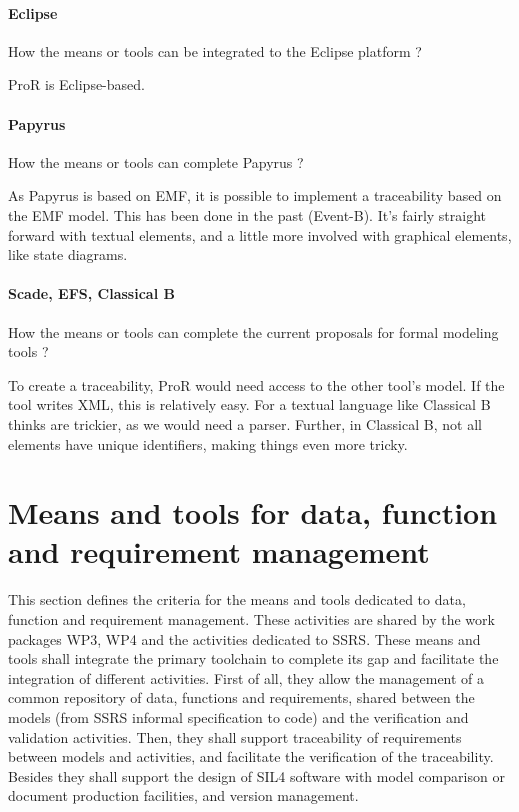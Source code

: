 \paragraph{Eclipse}
How the means or tools can be integrated to the Eclipse platform ?

\begin{author_comment}
ProR is Eclipse-based.
\end{author_comment}

\paragraph{Papyrus}
How the means or tools can complete  Papyrus ?

\begin{author_comment}
As Papyrus is based on EMF, it is possible to implement a traceability based on the EMF model.  This has been done in the past (Event-B).  It's fairly straight forward with textual elements, and a little more involved with graphical elements, like state diagrams.

\end{author_comment}

\paragraph{Scade, EFS, Classical B}
How the means or tools can complete the current proposals for formal modeling tools ?

\begin{author_comment}
To create a traceability, ProR would need access to the other tool's model.  If the tool writes XML, this is relatively easy.  For a textual language like Classical B thinks are trickier, as we would need a parser.  Further, in Classical B, not all elements have unique identifiers, making things even more tricky.
\end{author_comment}


\section{Means and tools for data, function and requirement management}
\label{sec:management}


This section defines the criteria for the means and tools dedicated to data, function and requirement management. These activities are shared by the work packages WP3, WP4 and the activities dedicated to  SSRS.
These means and tools shall integrate the primary toolchain to  complete its gap and facilitate the integration of different activities. First of all, they  allow the management of a common repository of data, functions and requirements, shared between the models (from SSRS informal specification to code) and the verification and validation activities.  
Then, they shall support traceability of requirements between models and activities, and facilitate the verification of the traceability.
Besides they shall support the design of SIL4 software with model comparison or document production facilities, and version management.

